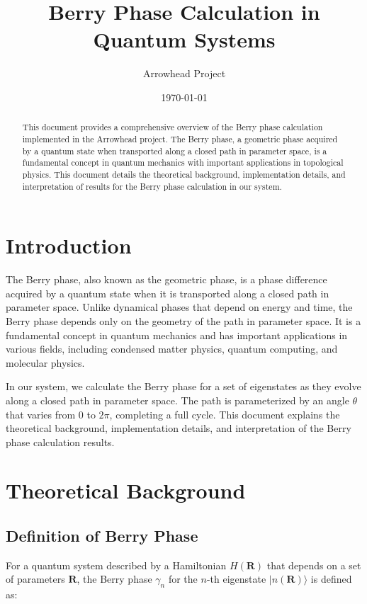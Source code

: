 \documentclass{article}
\title{Berry Phase Calculation in Quantum Systems}
\author{Arrowhead Project}
\date{\today}
\begin{document}
\maketitle

\begin{abstract}
This document provides a comprehensive overview of the Berry phase calculation implemented in the Arrowhead project. The Berry phase, a geometric phase acquired by a quantum state when transported along a closed path in parameter space, is a fundamental concept in quantum mechanics with important applications in topological physics. This document details the theoretical background, implementation details, and interpretation of results for the Berry phase calculation in our system.
\end{abstract}

\tableofcontents

\section{Introduction}

The Berry phase, also known as the geometric phase, is a phase difference acquired by a quantum state when it is transported along a closed path in parameter space. Unlike dynamical phases that depend on energy and time, the Berry phase depends only on the geometry of the path in parameter space. It is a fundamental concept in quantum mechanics and has important applications in various fields, including condensed matter physics, quantum computing, and molecular physics.

In our system, we calculate the Berry phase for a set of eigenstates as they evolve along a closed path in parameter space. The path is parameterized by an angle $\theta$ that varies from 0 to $2\pi$, completing a full cycle. This document explains the theoretical background, implementation details, and interpretation of the Berry phase calculation results.

\section{Theoretical Background}

\subsection{Definition of Berry Phase}

For a quantum system described by a Hamiltonian $H(\mathbf{R})$ that depends on a set of parameters $\mathbf{R}$, the Berry phase $\gamma_n$ for the $n$-th eigenstate $|n(\mathbf{R})\rangle$ is defined as:
\end{document}
